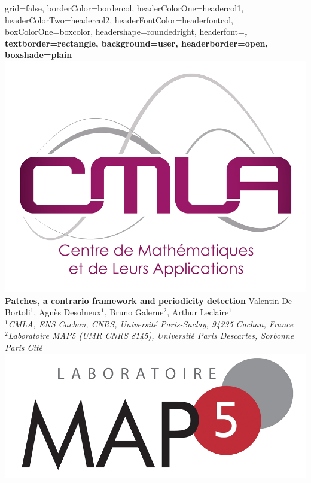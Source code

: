 \documentclass[a0paper,portrait]{baposter}
\begin{document}
\begin{poster}{
grid=false,
borderColor=bordercol, %
headerColorOne=headercol1, %
headerColorTwo=headercol2, %
headerFontColor=headerfontcol, %
boxColorOne=boxcolor, %
headershape=roundedright, %
headerfont=\Large\sf\bf, %
textborder=rectangle,
background=user,
headerborder=open, %
boxshade=plain
}
{\includegraphics[scale=0.6]{logo_CMLA_transparent.png}}
%
%
{ \bf  \huge {Patches, a contrario framework and periodicity detection}
}  %
{\vspace{0.3em} \smaller Valentin De Bortoli$^1$, Agnès Desolneux$^1$, Bruno Galerne$^2$, Arthur Leclaire$^1$\\  %
  
\smaller $^1$\it {CMLA, ENS Cachan, CNRS, Université Paris-Saclay, 94235 Cachan, France} \\ $^2$\it{Laboratoire MAP5 (UMR CNRS 8145), Université Paris Descartes, Sorbonne Paris Cité} } %
{\includegraphics[scale=0.13]{logo_MAP5_transparent.png}} %


\end{poster}
\end{document}

